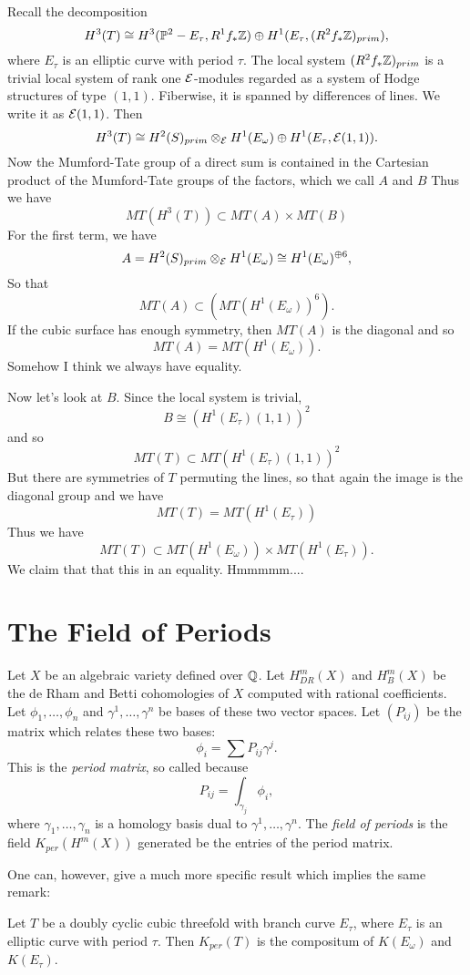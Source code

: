 Recall the decomposition \[ H^3(T) \cong H^3({ \mathbb P }^2 - E_\tau, R^1f_* { \mathbb Z }) \oplus
H^1(E_\tau, (R^2f_*{ \mathbb Z })_{prim}), \] where $E_\tau$ is an elliptic curve with period
$\tau$. The local system $(R^2f_*{ \mathbb Z })_{prim}$ is a trivial local system of rank one
${ \mathcal E }$-modules regarded as a system of Hodge structures of type $(1,1)$. Fiberwise, it
is spanned by differences of lines. We write it as ${ \mathcal E }(1,1)$. Then \[ H^3(T) \cong
H^2(S)_{prim} \otimes_{ \mathcal E } H^1(E_\omega) \oplus H^1(E_\tau,{ \mathcal E }(1,1)). \] Now the
Mumford-Tate group of a direct sum is contained in the Cartesian product of the
Mumford-Tate groups of the factors, which we call $A$ and $B$ Thus we have \[ MT(
H^3(T) ) \subset MT( A ) \times MT( B ) \] For the first term, we have \[ A =
H^2(S)_{prim} \otimes_{ \mathcal E } H^1(E_\omega) \cong H^1(E_\omega) ^{\oplus 6}, \] So that \[
MT(A) \subset (MT(H^1(E_\omega))^6). \] If the cubic surface has enough symmetry, then
$MT(A)$ is the diagonal and so \[ MT(A) = MT(H^1(E_\omega)). \] Somehow I think we
always have equality.

Now let's look at $B$. Since the local system is trivial, \[ B \cong
(H^1(E_\tau)(1,1))^2 \] and so \[ MT(T) \subset MT(H^1(E_\tau)(1,1))^2 \] But there are
symmetries of $T$ permuting the lines, so that again the image is the diagonal group
and we have \[ MT(T) = MT(H^1(E_\tau)) \] Thus we have
\[ MT(T) \subset
MT(H^1(E_\omega)) \times MT(H^1(E_\tau)).
\]
We claim that that this in an equality.
Hmmmmm....

\section{The Field of Periods}

Let $X$ be an algebraic variety defined over ${ \mathbb Q }$. Let $H^m_{DR}(X)$ and $H^m_B(X)$ be
the de Rham and Betti cohomologies of $X$ computed with rational coefficients. Let
$\phi_1, \ldots, \phi_n$ and $\gamma^1, \ldots, \gamma^n$ be bases of these two vector
spaces. Let $(P_{ij})$ be the matrix which relates these two bases: \[ \phi_i = \sum
P_{ij}\gamma^j. \] This is the \emph{period matrix}, so called because \[ P_{ij} =
\int_{\gamma_j}\phi_i, \] where $\gamma_1, \ldots, \gamma_n$ is a homology basis dual
to $\gamma^1, \ldots, \gamma^n$. The \emph{field of periods} is the field
$K_{per}(H^m(X))$ generated be the entries of the period matrix.

\noindent One can, however, give a much more specific result which implies the same
remark:


\begin{theorem} Let $T$ be a doubly cyclic cubic threefold with branch curve $E_\tau$,
where $E_\tau$ is an elliptic curve with period $\tau$. Then $K_{per}(T)$ is the
compositum of $K(E_\omega)$ and $K(E_\tau)$. \end{theorem}

